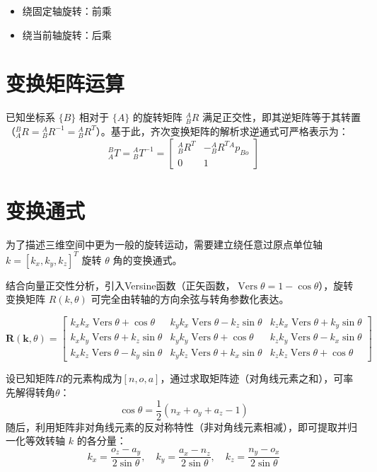 \begin{note}
    \begin{itemize}
        \item 绕固定轴旋转：前乘
        \item 绕当前轴旋转：后乘
    \end{itemize}
\end{note}

\section{变换矩阵运算}

已知坐标系 $\{B\}$ 相对于 $\{A\}$ 的旋转矩阵 ${}_{B}^{A}R$ 满足正交性，即其逆矩阵等于其转置（${}_{A}^{B}R = {}_{B}^{A}R^{-1} = {}_{B}^{A}R^{T}$）。基于此，齐次变换矩阵的解析求逆通式可严格表示为：
$$
    {}_{A}^{B}T = {}_{B}^{A}T^{-1} =
    \begin{bmatrix}
    {}_{B}^{A}R^{T} & -{}_{B}^{A}R^{T} {}^{A}p_{Bo} \\
    0 & 1
    \end{bmatrix}
$$

\section{变换通式}

为了描述三维空间中更为一般的旋转运动，需要建立绕任意过原点单位轴 $k = [k_x, k_y, k_z]^T$ 旋转 $\theta$ 角的变换通式。

结合向量正交性分析，引入Versine函数（正矢函数，$\operatorname{Vers}\theta = 1 - \cos\theta$），旋转变换矩阵 $R(k, \theta)$ 可完全由转轴的方向余弦与转角参数化表达。

$$
\boldsymbol{R}(\boldsymbol{k}, \theta) = 
\begin{bmatrix}
k_x k_x \operatorname{Vers}\theta + \cos\theta & k_y k_x \operatorname{Vers}\theta - k_z \sin\theta & k_z k_x \operatorname{Vers}\theta + k_y \sin\theta \\
k_x k_y \operatorname{Vers}\theta + k_z \sin\theta & k_y k_y \operatorname{Vers}\theta + \cos\theta & k_z k_y \operatorname{Vers}\theta - k_x \sin\theta \\
k_x k_z \operatorname{Vers}\theta - k_y \sin\theta & k_y k_z \operatorname{Vers}\theta + k_x \sin\theta & k_z k_z \operatorname{Vers}\theta + \cos\theta
\end{bmatrix}
$$

设已知矩阵$R$的元素构成为$\left[n, o, a\right]$，通过求取矩阵迹（对角线元素之和），可率先解得转角$\theta$：
$$
    \cos\theta = \frac{1}{2}(n_x + o_y + a_z - 1)
$$
随后，利用矩阵非对角线元素的反对称特性（非对角线元素相减），即可提取并归一化等效转轴 $k$ 的各分量：
$$
    k_x = \frac{o_z - a_y}{2\sin\theta}, \quad k_y = \frac{a_x - n_z}{2\sin\theta}, \quad k_z = \frac{n_y - o_x}{2\sin\theta}
$$
